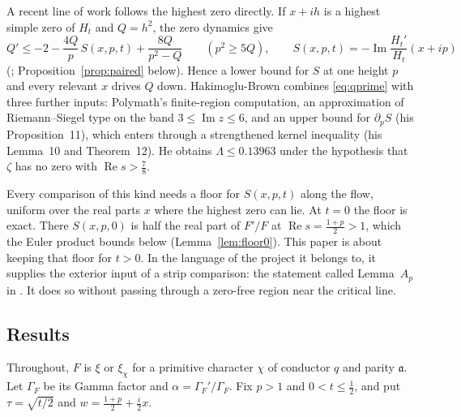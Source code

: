 \documentclass[11pt]{article}
\theoremstyle{definition}
\theoremstyle{remark}
\newcommand{\fa}{\mathfrak a}
\newcommand{\re}{\operatorname{Re}}
\newcommand{\im}{\operatorname{Im}}
\numberwithin{equation}{section}
\begin{document}
A recent line of work follows the highest zero directly. If $x+ih$ is a
highest simple zero of $H_t$ and $Q=h^2$, the zero dynamics give
\begin{equation}\label{eq:qprime}
Q'\le-2-\frac{4Q}{p}\,S(x,p,t)+\frac{8Q}{p^2-Q}\qquad(p^2\ge5Q),\qquad
S(x,p,t)=-\im\frac{H_t'}{H_t}(x+ip)
\end{equation}
(\cite[Section~4]{hb}; Proposition~\ref{prop:paired} below). Hence a lower
bound for $S$ at one height $p$ and every relevant $x$ drives $Q$ down.
Hakimoglu-Brown \cite{hb} combines \eqref{eq:qprime} with three further
inputs: Polymath's finite-region computation, an approximation of
Riemann--Siegel type on the band $3\le\im z\le6$, and an upper bound for
$\partial_pS$ (his Proposition~11), which enters through a strengthened
kernel inequality (his Lemma~10 and Theorem~12). He obtains
$\Lambda\le0.13963$ under the hypothesis that $\zeta$ has no zero with
$\re s>\frac78$.

Every comparison of this kind needs a floor for $S(x,p,t)$ along the flow,
uniform over the real parts $x$ where the highest zero can lie. At $t=0$
the floor is exact. There $S(x,p,0)$ is half the
real part of $F'/F$ at $\re s=\frac{1+p}2>1$, which the Euler product
bounds below (Lemma~\ref{lem:floor0}). This paper is about keeping that
floor for $t>0$. In the language of the project it belongs to, it supplies
the exterior input of a strip comparison: the statement called
Lemma~$A_p$ in \cite{p01}. It does so without passing through a
zero-free region near the critical line.

\subsection{Results}

Throughout, $F$ is $\xi$ or $\xi_\chi$ for a primitive character $\chi$ of
conductor $q$ and parity $\fa$. Let $\Gamma_F$ be its Gamma factor and
$\alpha=\Gamma_F'/\Gamma_F$. Fix $p>1$ and $0<t\le\frac12$, and put
$\tau=\sqrt{t/2}$ and $w=\frac{1+p}2+\frac i2x$.
\end{document}

